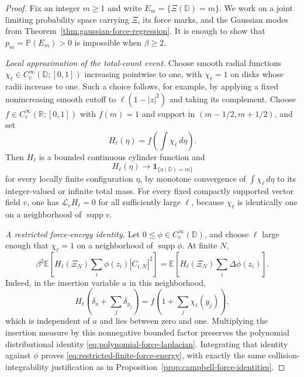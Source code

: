 \documentclass[11pt,a4paper]{article}
\numberwithin{equation}{section}
\theoremstyle{definition}
\theoremstyle{remark}
\newcommand{\D}{\mathbb D}
\newcommand{\E}{\mathbb E}
\newcommand{\supp}{\operatorname{supp}}
\begin{document}
\begin{proof}
Fix an integer $m\ge1$ and write $E_m=\{\Xi(\D)=m\}$.
We work on a joint limiting probability space carrying $\Xi$, its force
marks, and the Gaussian modes from
Theorem~\ref{thm:gaussian-force-regression}. It is enough to show that
$p_m=\mathbb P(E_m)>0$ is impossible when $\beta\ge2$.

\medskip\noindent
\emph{Local approximation of the total-count event.}
Choose smooth radial functions $\chi_\ell\in C_c^\infty(\D;[0,1])$
increasing pointwise to one, with $\chi_\ell=1$ on disks whose radii
increase to one. Such a choice follows, for example, by applying a
fixed nonincreasing smooth cutoff to $\ell(1-|z|^2)$ and taking its
complement. Choose $f\in C_c^\infty(\mathbb R;[0,1])$ with
$f(m)=1$ and support in $(m-1/2,m+1/2)$, and set
\[
 H_\ell(\eta)=f\left(\int\chi_\ell\,d\eta\right).
\]
Then $H_\ell$ is a bounded continuous cylinder function and
\[
 H_\ell(\eta)\longrightarrow\mathbf1_{\{\eta(\D)=m\}}
\]
for every locally finite configuration $\eta$, by monotone convergence
of $\int\chi_\ell\,d\eta$ to its integer-valued or infinite total mass.
For every fixed compactly supported vector field $v$, one has
$\mathcal L_vH_\ell=0$ for all sufficiently large $\ell$, because
$\chi_\ell$ is identically one on a neighborhood of $\supp v$.

\medskip\noindent
\emph{A restricted force-energy identity.}
Let $0\le\phi\in C_c^\infty(\D)$, and choose $\ell$ large enough that
$\chi_\ell=1$ on a neighborhood of $\supp\phi$. At finite $N$,
\begin{equation}\label{eq:restricted-finite-force-energy}
 \beta^2\E\left[H_\ell(\Xi_N)
                  \sum_i\phi(z_i)|C_{i,N}|^2\right]
 =\E\left[H_\ell(\Xi_N)\sum_i\Delta\phi(z_i)\right].
\end{equation}
Indeed, in the insertion variable $a$ in this neighborhood,
\[
 H_\ell\left(\delta_a+\sum_j\delta_{y_j}\right)
 =f\left(1+\sum_j\chi_\ell(y_j)\right),
\]
which is independent of $a$ and lies between zero and one. Multiplying
the insertion measure by this nonnegative bounded factor preserves
the polynomial distributional identity
\eqref{eq:polynomial-force-laplacian}. Integrating that identity against
$\phi$ proves \eqref{eq:restricted-finite-force-energy}, with exactly
the same collision-integrability justification as in
Proposition~\ref{prop:campbell-force-identities}.


\end{proof}
\end{document}
